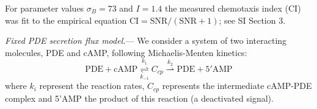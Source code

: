 \documentclass[%
 reprint,
 amsmath,amssymb,
 aps,prl,
 showpacs,
 linenumbers
]{revtex4-1}
\begin{document}
For parameter values $\sigma_{B}=73$ and $I=1.4$ the measured chemotaxis index (CI) was fit to the empirical equation $\mathrm{CI} = \mathrm{SNR}/(\mathrm{SNR} + 1)$; see SI Section 3.

%
%
%
%
\emph{Fixed PDE secretion flux model.}--- We consider a system of two interacting molecules, PDE and cAMP, following
Michaelis-Menten kinetics:
\begin{equation}
	\mathrm{PDE+cAMP}\overset{k_{1}}{\underset{k_{-1}}{\rightleftharpoons}}C_{cp}\overset{k_{2}}{\rightharpoonup}\mathrm{PDE+5'AMP}
	\label{eq:PDEcAMPint}
\end{equation}
where $k_i$ represent the reaction rates, $C_{cp}$ represents the intermediate cAMP-PDE complex and
5'AMP the product of this reaction (a deactivated signal).
\end{document}
